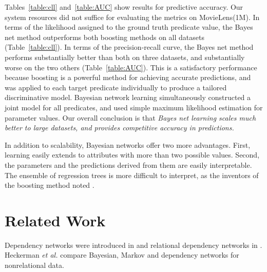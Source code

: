 \documentclass[runningheads,a4paper]{llncs}
\begin{document}
Tables~\ref{table:cll} and~\ref{table:AUC} show results for predictive accuracy. Our system resources did not suffice for evaluating the metrics on MovieLens(1M).  In terms of the likelihood assigned to the ground truth predicate value, the Bayes net method outperforms both boosting methods on all datasets (Table~\ref{table:cll}). In terms of the precision-recall curve, the Bayes net method performs substantially better than both on three datasets, and substantially worse on the two others (Table~\ref{table:AUC}). This is a satisfactory performance because boosting is a powerful method for achieving accurate predictions, and was applied to each target predicate individually to produce a tailored discriminative model. Bayesian network learning simultaneously constructed a joint model for all predicates, and used simple maximum likelihood estimation for parameter values.
 Our overall conclusion is that \emph{Bayes net learning scales much better to large datasets, and provides competitive accuracy in predictions.} 

In addition to scalability, Bayesian networks offer two more advantages. First, learning easily extends to attributes with more than two possible values. Second, the parameters and the predictions derived from them are easily interpretable. The ensemble of regression trees is more difficult to interpret, as the inventors of the boosting method noted  \cite{Natarajan2012}.

\section{Related Work}


Dependency networks were introduced in \cite{Heckerman2000} and relational dependency networks in \cite{Neville2007}. 
Heckerman {\em et al.} compare Bayesian, Markov and dependency networks for nonrelational data. 
\end{document}
